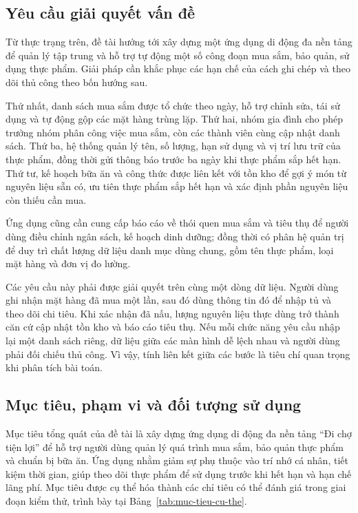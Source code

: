 \subsection{Yêu cầu giải quyết vấn đề}\label{ssec:yeu-cau-giai-quyet}

Từ thực trạng trên, đề tài hướng tới xây dựng một ứng dụng di động đa nền tảng để quản lý tập trung và hỗ trợ tự động một số công đoạn mua sắm, bảo quản, sử dụng thực phẩm. Giải pháp cần khắc phục các hạn chế của cách ghi chép và theo dõi thủ công theo bốn hướng sau.

Thứ nhất, danh sách mua sắm được tổ chức theo ngày, hỗ trợ chỉnh sửa, tái sử dụng và tự động gộp các mặt hàng trùng lặp. Thứ hai, nhóm gia đình cho phép trưởng nhóm phân công việc mua sắm, còn các thành viên cùng cập nhật danh sách. Thứ ba, hệ thống quản lý tên, số lượng, hạn sử dụng và vị trí lưu trữ của thực phẩm, đồng thời gửi thông báo trước ba ngày khi thực phẩm sắp hết hạn. Thứ tư, kế hoạch bữa ăn và công thức được liên kết với tồn kho để gợi ý món từ nguyên liệu sẵn có, ưu tiên thực phẩm sắp hết hạn và xác định phần nguyên liệu còn thiếu cần mua.

Ứng dụng cũng cần cung cấp báo cáo về thói quen mua sắm và tiêu thụ để người dùng điều chỉnh ngân sách, kế hoạch dinh dưỡng; đồng thời có phân hệ quản trị để duy trì chất lượng dữ liệu danh mục dùng chung, gồm tên thực phẩm, loại mặt hàng và đơn vị đo lường.

Các yêu cầu này phải được giải quyết trên cùng một dòng dữ liệu. Người dùng ghi nhận mặt hàng đã mua một lần, sau đó dùng thông tin đó để nhập tủ và theo dõi chi tiêu. Khi xác nhận đã nấu, lượng nguyên liệu thực dùng trở thành căn cứ cập nhật tồn kho và báo cáo tiêu thụ. Nếu mỗi chức năng yêu cầu nhập lại một danh sách riêng, dữ liệu giữa các màn hình dễ lệch nhau và người dùng phải đối chiếu thủ công. Vì vậy, tính liên kết giữa các bước là tiêu chí quan trọng khi phân tích bài toán.

\subsection{Mục tiêu, phạm vi và đối tượng sử dụng}\label{ssec:muc-tieu}

Mục tiêu tổng quát của đề tài là xây dựng ứng dụng di động đa nền tảng “Đi chợ tiện lợi” để hỗ trợ người dùng quản lý quá trình mua sắm, bảo quản thực phẩm và chuẩn bị bữa ăn. Ứng dụng nhằm giảm sự phụ thuộc vào trí nhớ cá nhân, tiết kiệm thời gian, giúp theo dõi thực phẩm để sử dụng trước khi hết hạn và hạn chế lãng phí. Mục tiêu được cụ thể hóa thành các chỉ tiêu có thể đánh giá trong giai đoạn kiểm thử, trình bày tại Bảng~\ref{tab:muc-tieu-cu-the}.

